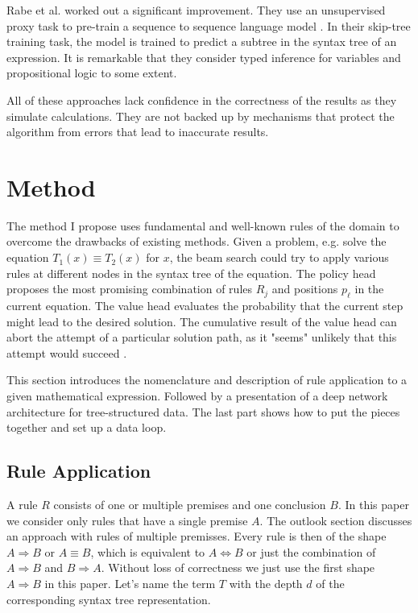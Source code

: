 \documentclass{scrartcl}
\theoremstyle{definition}
\begin{document}
Rabe et al. worked out a significant improvement. They use an unsupervised proxy task to pre-train a sequence to sequence language model \cite{rabe2020mathematical}.
In their skip-tree training task, the model is trained to predict a subtree in the syntax tree of an expression.
It is remarkable that they consider typed inference for variables and propositional logic to some extent.

All of these approaches lack confidence in the correctness of the results as they simulate calculations.
They are not backed up by mechanisms that protect the algorithm from errors that lead to inaccurate results.

\section{Method}

The method I propose uses fundamental and well-known rules of the domain to overcome the drawbacks of existing methods.
Given a problem, e.g. solve the equation $T_1\left(x\right)\equiv T_2\left(x\right)$ for $x$,
the beam search could try to apply various rules at different nodes in the syntax tree of the equation.
The policy head proposes the most promising combination of rules $R_j$ and positions $p_\ell$ in the current equation.
The value head evaluates the probability that the current step might lead to the desired solution.
The cumulative result of the value head can abort the attempt of a particular solution path, as it "seems" unlikely that this attempt would succeed \cite{44806}.

This section introduces the nomenclature and description of rule application to a given mathematical expression.
Followed by a presentation of a deep network architecture for tree-structured data.
The last part shows how to put the pieces together and set up a data loop.

\subsection{Rule Application}
\label{ssec:rule_application}
A rule $R$ consists of one or multiple premises and one conclusion $B$.
In this paper we consider only rules that have a single premise $A$.
The outlook section discusses an approach with rules of multiple premisses. 
Every rule is then of the shape $A \Longrightarrow B$ or $A \equiv B$, which is equivalent to $A \Longleftrightarrow B$ or just the combination of $A \Longrightarrow B$ and $B \Longrightarrow A$.
Without loss of correctness we just use the first shape $A \Longrightarrow B$ in this paper.
Let's name the term $T$ with the depth $d$ of the corresponding syntax tree representation.
\end{document}
